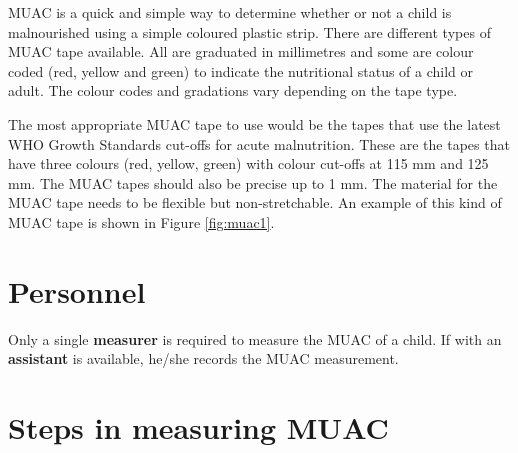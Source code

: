 \documentclass[12pt,]{book}
\theoremstyle{definition}
\theoremstyle{definition}
\theoremstyle{definition}
\theoremstyle{remark}
\begin{document}
MUAC is a quick and simple way to determine whether or not a child is
malnourished using a simple coloured plastic strip. There are different
types of MUAC tape available. All are graduated in millimetres and some
are colour coded (red, yellow and green) to indicate the nutritional
status of a child or adult. The colour codes and gradations vary
depending on the tape type.

The most appropriate MUAC tape to use would be the tapes that use the
latest WHO Growth Standards cut-offs for acute malnutrition. These are
the tapes that have three colours (red, yellow, green) with colour
cut-offs at 115 mm and 125 mm. The MUAC tapes should also be precise up
to 1 mm. The material for the MUAC tape needs to be flexible but
non-stretchable. An example of this kind of MUAC tape is shown in Figure
\ref{fig:muac1}.

\hypertarget{personnel-2}{%
\section{Personnel}\label{personnel-2}}

Only a single \textbf{measurer} is required to measure the MUAC of a
child. If with an \textbf{assistant} is available, he/she records the
MUAC measurement.

\hypertarget{steps-in-measuring-muac}{%
\section{Steps in measuring MUAC}\label{steps-in-measuring-muac}}
\end{document}
